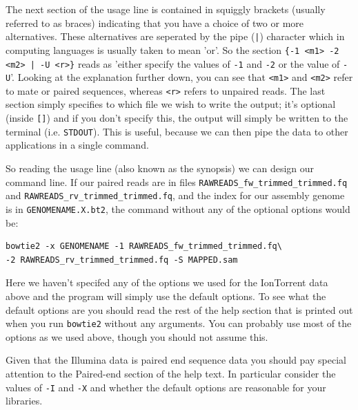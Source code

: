 \documentclass[11pt]{article}
\begin{document}
The next section of the usage line is contained in squiggly brackets (usually
referred to as braces) indicating that you have a choice of two or more
alternatives. These alternatives are seperated by the pipe (\texttt{|}) character
which in computing languages is usually taken to mean 'or'. So the section 
\texttt{\{-1 <m1> -2 <m2> | -U <r>\}} reads as 'either specify the values of \texttt{-1} and
\texttt{-2} or the value of \texttt{-U}'. Looking at the explanation further down, you can
see that \texttt{<m1>} and \texttt{<m2>} refer to mate or paired sequences, whereas \texttt{<r>}
refers to unpaired reads. The last section simply specifies to which file we
wish to write the output; it's optional (inside \texttt{[]}) and if you don't specify this, 
the output will simply be
written to the terminal (i.e. \texttt{STDOUT}). This is useful, because we can then
pipe the data to other applications in a single command.

So reading the usage line (also known as the synopsis) we can design our
command line. If our paired reads are in files
\texttt{RAWREADS\_fw\_trimmed\_trimmed.fq} and 
\texttt{RAWREADS\_rv\_trimmed\_trimmed.fq}, and the index for our assembly genome is in 
\texttt{GENOMENAME.X.bt2}, the command without any of the optional options would be:

\begin{verbatim}
bowtie2 -x GENOMENAME -1 RAWREADS_fw_trimmed_trimmed.fq\
-2 RAWREADS_rv_trimmed_trimmed.fq -S MAPPED.sam
\end{verbatim}

Here we haven't specifed any of the options we used for the IonTorrent data
above and the program will simply use the default options. To see what the
default options are you should read the rest of the help section that is
printed out when you run \texttt{bowtie2} without any arguments. You can probably
use most of the options as we used above, though you should not assume this.

Given that the Illumina data is paired end sequence data you should pay
special attention to the Paired-end section of the help text. In particular
consider the values of \texttt{-I} and \texttt{-X} and whether the default options are
reasonable for your libraries.
\end{document}
